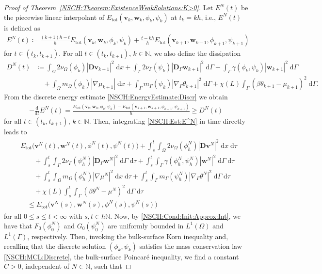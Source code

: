 \documentclass[11pt,reqno]{amsart}
\theoremstyle{remark}
\numberwithin{equation}{section}
\newcommand{\abs}[1]{|#1|}
\newcommand{\N}{\mathbb N}
\newcommand{\intO}{\int_\Omega}
\newcommand{\intG}{\int_\Gamma}
\newcommand{\dx}{\;\mathrm{d}x}
\newcommand{\dxtau}{\;\mathrm{d}x\;\mathrm{d}\tau}
\newcommand{\dGtau}{\;\mathrm{d}\Ga\;\mathrm{d}\tau}
\newcommand{\dG}{\;\mathrm d\Ga}
\newcommand{\ddt}{\frac{\mathrm d}{\mathrm dt}}
\newcommand{\Grad}{\nabla}
\newcommand{\Gradg}{\nabla_\Ga}
\newcommand{\Om}{\Omega}
\newcommand{\Ga}{\Gamma}
\newcommand{\bv}{\mathbf v}
\newcommand{\bw}{\mathbf w}
\newcommand{\D}{\mathbf D}
\newcommand{\Dg}{\mathbf D_\Ga}
\begin{document}
\begin{proof}[Proof of Theorem~\ref{NSCH:Theorem:ExistenceWeakSolutions:K>0}]
    Let $E^N(t)$ be the piecewise linear interpolant of $E_{\mathrm{tot}}(\bv_k,\bw_k,\phi_k,\psi_k)$ at $t_k = kh$, i.e., $E^N(t)$ is defined as
    \begin{align*}
        E^N(t) \coloneqq \frac{(k+1)h - t}{h} E_{\mathrm{tot}}(\bv_k,\bw_k,\phi_k,\psi_k) + \frac{t-kh}{h}E_{\mathrm{tot}}(\bv_{k+1},\bw_{k+1},\phi_{k+1},\psi_{k+1})
    \end{align*}
    for $t\in (t_k,t_{k+1})$. For all $t\in (t_k,t_{k+1})$, $k\in\N$, we also define the dissipation
    \begin{align*}
        D^N(t) &\coloneqq \intO 2\nu_\Om(\phi_k)\abs{\D\bv_{k+1}}^2\dx + \intG 2\nu_\Ga(\psi_k)\abs{\Dg\bw_{k+1}}^2\dG + \intG \gamma(\phi_k,\psi_k)\abs{\bw_{k+1}}^2\dG \\
        &\quad + \intO m_\Om(\phi_k)\abs{\Grad\mu_{k+1}}\dx + \intG m_\Ga(\psi_k)\abs{\Gradg\theta_{k+1}}^2\dG + \chi(L) \intG (\beta\theta_{k+1} - \mu_{k+1})^2\dG.
    \end{align*}
    From the discrete energy estimate \eqref{NSCH:EnergyEstimate:Discr} we obtain
    \begin{align}\label{NSCH:Est:E^N}
        -\ddt E^N(t) = \frac{E_{\mathrm{tot}}(\bv_k,\bw_k,\phi_k,\psi_k) - E_{\mathrm{tot}}(\bv_{k+1},\bw_{k+1},\phi_{k+1},\psi_{k+1})}{h} \geq D^N(t)
    \end{align}
    for all $t\in(t_k,t_{k+1})$, $k\in\N$. Then, integrating \eqref{NSCH:Est:E^N} in time directly leads to
    \begin{align}\label{NSCH:EnergyEstimate:Cont}
        \begin{split}
            &E_{\mathrm{tot}}\big(\bv^N(t),\bw^N(t),\phi^N(t),\psi^N(t)\big) + \int_s^t\intO 2\nu_\Om(\phi_h^N)\abs{\D\bv^N}^2\dxtau \\
            &\qquad + \int_s^t\intG 2\nu_\Ga(\psi_h^N)\abs{\Dg\bw^N}^2\dGtau + \int_s^t\intG \gamma(\phi_h^N,\psi_h^N)\abs{\bw^N}^2\dGtau \\
            &\qquad + \int_s^t\intO m_\Om(\phi_h^N)\abs{\Grad\mu^N}^2\dxtau + \int_s^t\intG m_\Ga(\psi_h^N)\abs{\Gradg\theta^N}^2\dGtau \\
            &\qquad + \chi(L) \int_s^t\intG (\beta\theta^N - \mu^N)^2\dGtau \\
            &\quad \leq E_{\mathrm{tot}}\big(\bv^N(s),\bw^N(s),\phi^N(s),\psi^N(s)\big)
        \end{split}
    \end{align}
    for all $0 \leq s \leq t < \infty$ with $s,t\in h\N$. Now, by \eqref{NSCH:Cond:Init:Approx:Int}, we have that $F_0(\phi_0^N)$ and $G_0(\psi_0^N)$ are uniformly bounded in $L^1(\Om)$ and $L^1(\Ga)$, respectively. Then, invoking the bulk-surface Korn inequality and, recalling that the discrete solution $(\phi_k,\psi_k)$ satisfies the mass conservation law \eqref{NSCH:MCL:Discrete}, the bulk-surface Poincar\'{e} inequality, we find a constant $C > 0$, independent of $N\in\N$, such that

\end{proof}
\end{document}
